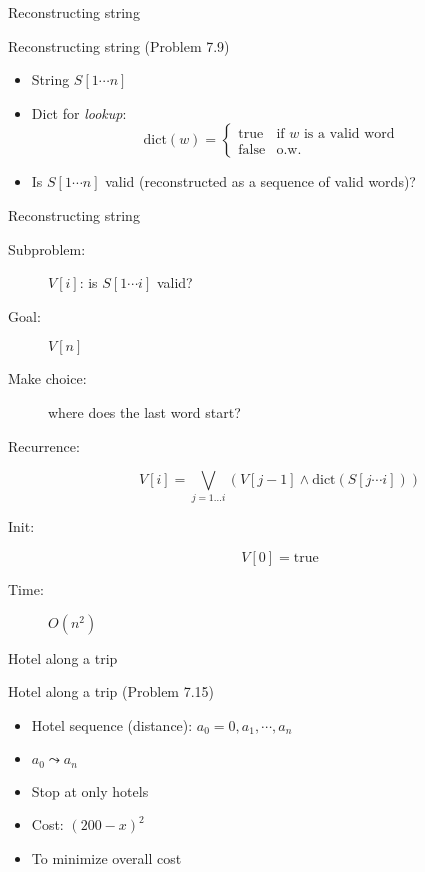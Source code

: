 \begin{frame}{Reconstructing string}
  \begin{exampleblock}{Reconstructing string (Problem 7.9)}
    \begin{itemize}
      \item String $S[1 \cdots n]$
      \item Dict for \emph{lookup}:
		\begin{displaymath}
		  \text{dict}(w) = \left\{ \begin{array}{ll}
			\text{true} & \textrm{if } w \textrm{ is a valid word}\\
			\text{false} & \textrm{o.w.}
		  \end{array} \right.
		\end{displaymath}
	  \item Is $S[1 \cdots n]$ valid (reconstructed as a sequence of valid words)?
    \end{itemize}
  \end{exampleblock}
\end{frame}
\begin{frame}{Reconstructing string}
  \begin{description}
	\item[Subproblem:] $V[i]$: is $S[1 \cdots i]$ valid?
	\item[Goal:] $V[n]$
	\pause
	\item[Make choice:] where does the last word start?
	\item[Recurrence:] 
	  \[ 
		V[i] = \bigvee_{j = 1 \ldots i} (V[j-1] \land \text{dict}(S[j \cdots i]))
	  \]
	\pause
	\item[Init:]
	  \[
		V[0] = \text{true}
	  \]
	\item[Time:] $O(n^2)$
  \end{description}
\end{frame}
\begin{frame}{Hotel along a trip}
  \begin{exampleblock}{Hotel along a trip (Problem 7.15)}
    \begin{itemize}
      \item Hotel sequence (distance): $a_{0} = 0, a_{1}, \cdots, a_{n}$
      \item $a_0 \leadsto a_n$ 
	  \item Stop at only hotels
      \item Cost: $(200 - x)^{2}$ 
      \item To minimize overall cost
    \end{itemize}
  \end{exampleblock}
\end{frame}
